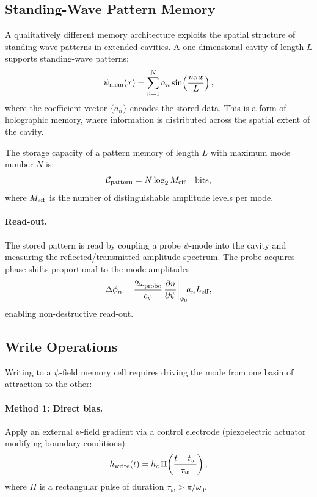 \documentclass[12pt,a4paper,twoside]{article}
\begin{document}
\subsection{Standing-Wave Pattern Memory}\label{sec:sw_memory}

A qualitatively different memory architecture exploits the spatial structure of standing-wave patterns in extended cavities. A one-dimensional cavity of length $L$ supports standing-wave patterns:
\begin{equation}
\psi_{\rm mem}(x) = \sum_{n=1}^{N} a_n \sin\!\left(\frac{n\pi x}{L}\right),
\label{eq:sw_pattern}
\end{equation}
where the coefficient vector $\{a_n\}$ encodes the stored data. This is a form of holographic memory, where information is distributed across the spatial extent of the cavity.

The storage capacity of a pattern memory of length $L$ with maximum mode number $N$ is:
\begin{equation}
\mathcal{C}_{\rm pattern} = N \log_2 M_{\rm eff}\quad \text{bits},
\end{equation}
where $M_{\rm eff}$ is the number of distinguishable amplitude levels per mode.

\paragraph{Read-out.} The stored pattern is read by coupling a probe $\psi$-mode into the cavity and measuring the reflected/transmitted amplitude spectrum. The probe acquires phase shifts proportional to the mode amplitudes:
\begin{equation}
\Delta\phi_n = \frac{2\omega_{\rm probe}}{c_\psi}\,\frac{\partial n}{\partial \psi}\bigg|_{\psi_0}\! a_n L_{\rm eff},
\end{equation}
enabling non-destructive read-out.

\subsection{Write Operations}\label{sec:write}

Writing to a $\psi$-field memory cell requires driving the mode from one basin of attraction to the other:

\paragraph{Method 1: Direct bias.} Apply an external $\psi$-field gradient via a control electrode (piezoelectric actuator modifying boundary conditions):
\begin{equation}
h_{\rm write}(t) = h_c\,\Pi\!\left(\frac{t - t_w}{\tau_w}\right),
\end{equation}
where $\Pi$ is a rectangular pulse of duration $\tau_w > \pi/\omega_0$.
\end{document}
